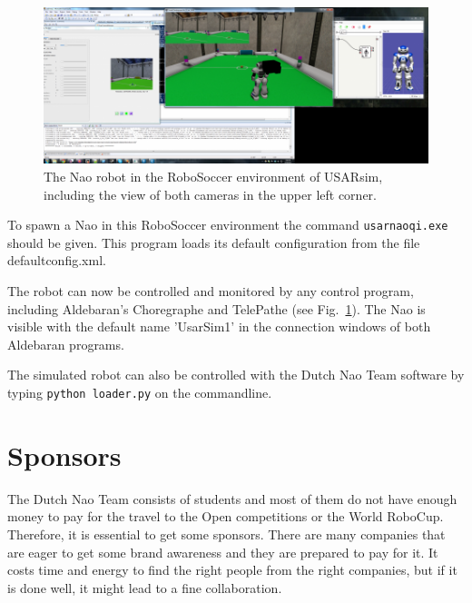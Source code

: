 \documentclass[11pt,a4paper,oneside]{article}
\begin{document}
\begin{figure}[htb]        
\centering\includegraphics[width=.95\columnwidth]{NaoWithTwoCamerasInSoccerWorld.png}
\caption{The  Nao robot in the RoboSoccer environment of USARsim, including the view of both cameras in the upper left corner.}\label{fig:nao_robosoccer}
\end{figure}

To spawn a Nao in this RoboSoccer environment the command \texttt{usarnaoqi.exe} should be given. This program loads its default configuration from the file defaultconfig.xml.

The robot can now be controlled and monitored by any control program, including Aldebaran's Choregraphe and TelePathe (see Fig.~\ref{fig:nao_robosoccer}). The Nao is visible with the default name 'UsarSim1' in the connection windows of both Aldebaran programs.

The simulated robot can also be controlled with the Dutch Nao Team software by typing \texttt{python loader.py} on the commandline.

\section{Sponsors}
The Dutch Nao Team consists of students and most of them do not have enough money to pay for the travel to the Open competitions or the World RoboCup. Therefore, it is essential to get some sponsors. There are many companies that are eager to get some brand awareness and they are prepared to pay for it. It costs time and energy to find the right people from the right companies, but if it is done well, it might lead to a fine collaboration.
\end{document}
